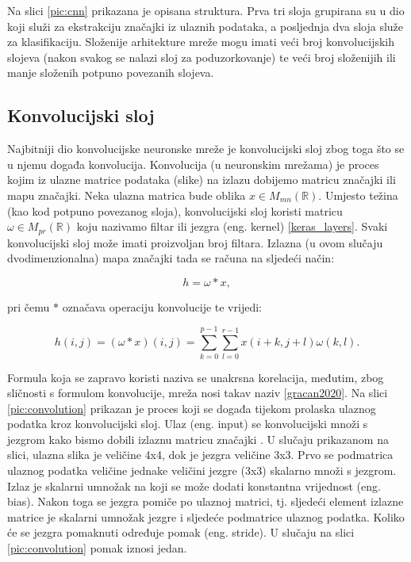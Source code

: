 Na slici \ref{pic:cnn} prikazana je opisana struktura. Prva tri sloja grupirana su
u dio koji služi za ekstrakciju značajki iz ulaznih podataka, a posljednja dva
sloja služe za klasifikaciju. Složenije arhitekture mreže mogu imati veći broj
konvolucijskih slojeva (nakon svakog se nalazi sloj za poduzorkovanje) te veći broj
složenijih ili manje složenih potpuno povezanih slojeva.

\subsection{Konvolucijski sloj}
\label{sub:conv}

Najbitniji dio konvolucijske neuronske mreže je konvolucijski sloj zbog toga što se
u njemu događa konvolucija. Konvolucija (u neuronskim mrežama) je proces kojim 
iz ulazne matrice podataka (slike) na izlazu dobijemo matricu značajki ili
mapu značajki. Neka ulazna matrica bude oblika \( x \in M_{mn}(\mathbb{R}) \).
Umjesto težina (kao kod potpuno povezanog sloja), konvolucijski sloj koristi
matricu \( \omega \in M_{pr}(\mathbb{R}) \) koju nazivamo filtar ili
jezgra (eng. kernel) \ref{keras_layers}. Svaki konvolucijski 
sloj može imati proizvoljan broj filtara. Izlazna (u ovom slučaju dvodimenzionalna)
mapa značajki tada se računa na sljedeći način:

\begin{equation}
h = \omega * x,
\end{equation}

pri čemu \( * \) označava operaciju konvolucije te vrijedi:

\begin{equation}
h(i, j) = (\omega * x)(i, j) = 
\sum_{k=0}^{p-1} \sum_{l=0}^{r-1} x(i + k, j + l) \omega(k, l).
\end{equation}

Formula koja se zapravo koristi naziva se unakrsna korelacija, međutim, zbog sličnosti s 
formulom konvolucije, mreža nosi takav naziv \ref{gracan2020}. Na slici 
\ref{pic:convolution} prikazan je proces koji se događa tijekom prolaska 
ulaznog podatka kroz konvolucijski sloj. Ulaz (eng. input) se konvolucijski množi
s jezgrom kako bismo dobili izlaznu matricu značajki \cite{cnn_how}. U slučaju prikazanom na slici,
ulazna slika je veličine 4x4, dok je jezgra veličine 3x3. Prvo se podmatrica ulaznog
podatka veličine jednake veličini jezgre (3x3) skalarno množi s jezgrom. Izlaz je 
skalarni umnožak na koji se može dodati konstantna vrijednost (eng. bias). Nakon
toga se jezgra pomiče po ulaznoj matrici, tj. sljedeći element izlazne matrice je
skalarni umnožak jezgre i sljedeće podmatrice ulaznog podatka. Koliko će se jezgra
pomaknuti određuje pomak (eng. stride). U slučaju na slici \ref{pic:convolution}
pomak iznosi jedan.

